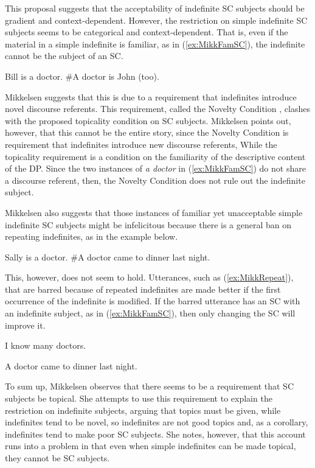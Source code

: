 \documentclass[
	letterpaper,
]{article}
\begin{document}
This proposal suggests that the acceptability of indefinite SC subjects should be gradient and context-dependent.
However, the restriction on simple indefinite SC subjects seems to be categorical and context-dependent.
That is, even if the material in a simple indefinite is familiar, as in (\ref{ex:MikkFamSC}), the indefinite cannot be the subject of an SC.
\begin{exe}
	\ex\label{ex:MikkFamSC} Bill is a doctor. \#A doctor is John (too).
\end{exe}
Mikkelsen suggests that this is due to a requirement that indefinites introduce novel discourse referents.
This requirement, called the Novelty Condition \parencite{heim1982semantics}, clashes with the proposed topicality condition on SC subjects.
Mikkelsen points out, however, that this cannot be the entire story, since the Novelty Condition is requirement that indefinites introduce new discourse referents, While the topicality requirement is a condition on the familiarity of the descriptive content of the DP.
Since the two instances of \textit{a doctor} in (\ref{ex:MikkFamSC}) do not share a discourse referent, then, the Novelty Condition does not rule out the indefinite subject.

Mikkelsen also suggests that those instances of familiar yet unacceptable simple indefinite SC subjects might be infelicitous because there is a general ban on repeating indefinites, as in the example below.
\begin{exe}
	\ex\label{ex:MikkRepeat} Sally is a doctor. \#A doctor came to dinner last night.
\end{exe}
This, however, does not seem to hold.
Utterances, such as (\ref{ex:MikkRepeat}), that are barred because of repeated indefinites are made better if the first occurrence of the indefinite is modified.
If the barred utterance has an SC with an indefinite subject, as in (\ref{ex:MikkFamSC}), then only changing the SC will improve it.
\begin{exe}
\ex\label{ex:IndefGiven} I know many doctors.
\begin{xlist}
	\ex A doctor came to dinner last night.
\end{xlist}
\end{exe}
To sum up, Mikkelsen observes that there seems to be a requirement that SC subjects be topical.
She attempts to use this requirement to explain the restriction on indefinite subjects, arguing that topics must be given, while indefinites tend to be novel, so indefinites are not good topics and, as a corollary, indefinites tend to make poor SC subjects.
She notes, however, that this account runs into a problem in that even when simple indefinites can be made topical, they cannot be SC subjects.
\end{document}
